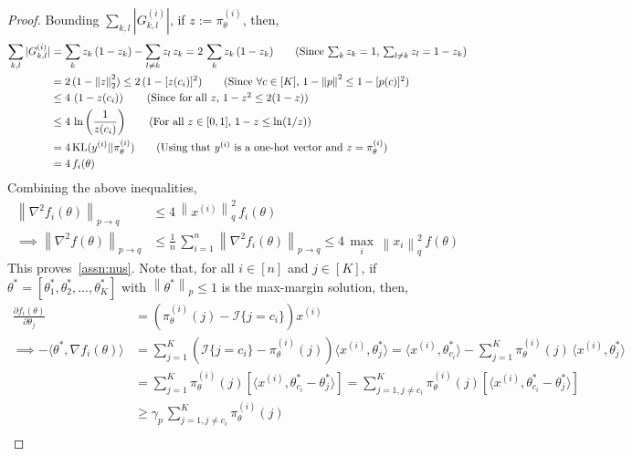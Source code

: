 \documentclass{article}
\newcommand{\normsq}[1]{\left\|#1 \right\|^{2}}
\newcommand{\norm}[1]{\left\|#1 \right\|}
\def\cI{{\mathcal{I}}}
\begin{document}
\begin{proof}
Bounding $\sum_{k,l} |G^{(i)}_{k,l}| $, if $z := \pi_\theta^{(i)}$, then, 
\begin{align*}
\sum_{k,l} |G^{(i)}_{k,l}| & = \sum_k z_k \, (1-z_k) - \sum_{l \neq k} z_l \, z_k = 2 \, \sum_k z_k \, (1-z_k) \tag{Since $\sum_k z_k = 1$, $\sum_{l \neq k} z_l = 1 - z_k$} \\
& = 2 \, (1 - \norm{z}_2^2) \leq 2 \, (1 - [z(c_{i})]^2)  \tag{Since $\forall c \in [K]$, $1 - \normsq{p} \leq 1 - [p(c)]^2$} \nonumber \\
& \leq 4 \, \left(1 - z(c_{i}) \right) \tag{Since for all $z$, $1 - z^2 \leq 2 (1 - z)$} \nonumber \\
& \leq 4  \, \ln\left(\frac{1}{z(c_{i})} \right) \tag{For all $z \in [0,1]$, $1 - z \leq \ln(1/z)$} \nonumber \\
& = 4  \, \text{KL}(y^{(i)} || \pi_\theta^{(i)}) \tag{Using that $y^{(i)}$ is a one-hot vector and $z =  \pi_\theta^{(i)}$} \\
& = 4 \, f_i(\theta)
\end{align*}
Combining the above inequalities, 
\begin{align*}
\norm{\nabla^2 f_i(\theta)}_{p \to q} & \leq  4 \, \normsq{x^{(i)}}_q \, f_i(\theta)     \\
\implies \norm{\nabla^2 f(\theta)}_{p \to q} & \leq \frac{1}{n} \,\sum_{i = 1}^{n} \norm{\nabla^2 f_i(\theta)}_{p \to q} \leq  4 \, \max_i\, \normsq{x_i}_q \, f(\theta) \tag{Using triangle inequality and above relation} 
\end{align*}
This proves~\cref{assn:nus}. Note that, for all $i \in [n]$ and $j \in [K]$, if $\theta^* = [\theta_1^*, \theta_2^*, \ldots, \theta^*_K]$ with $\norm{\theta^*}_p \leq 1$ is the max-margin solution, then, 
\begin{align*}
\frac{\partial f_i(\theta)}{\partial \theta_{j}} & = \left( \pi_\theta^{(i)}(j) - \cI\{j = c_{i} \} \right) x^{(i)}  \\
\implies -\langle \theta^*, \nabla f_i(\theta) \rangle & = \sum_{j = 1}^{K} \left( \cI\{j = c_{i} \} - \pi_\theta^{(i)}(j)  \right) \langle x^{(i)}, \theta^*_j \rangle = \langle x^{(i)}, \theta^*_{c_{i}} \rangle - \sum_{j = 1}^{K} \pi_\theta^{(i)}(j) \, \langle x^{(i)}, \theta^*_j \rangle \\
& = \sum_{j = 1}^{K} \pi_\theta^{(i)}(j) \left[ \langle x^{(i)}, \theta^*_{c_{i}}  - \theta^*_j \rangle \right] =  \sum_{j = 1, j \neq c_{i}}^{K} \pi_\theta^{(i)}(j) \left[ \langle x^{(i)}, \theta^*_{c_{i}}  - \theta^*_j \rangle \right] \\
& \geq \gamma_p \, \sum_{j = 1, j \neq c_{i}}^{K} \pi_\theta^{(i)}(j) \tag{By definition of the margin $\gamma_p$} \\

\end{align*}
\end{proof}
\end{document}
